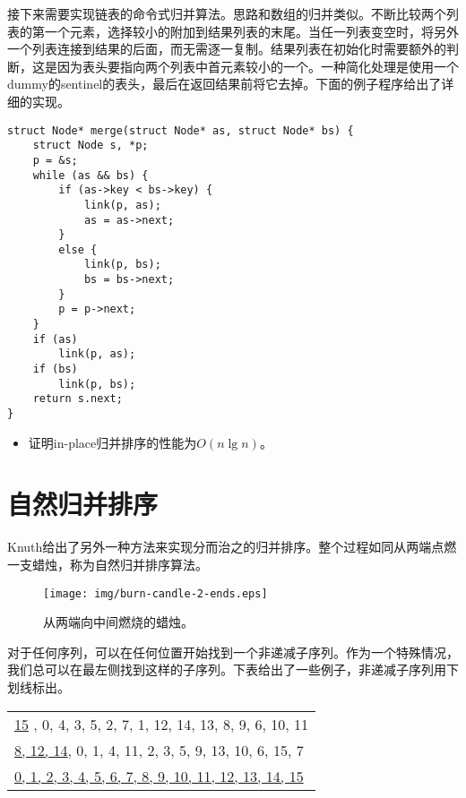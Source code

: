 \documentclass[UTF8]{article}
\begin{document}
接下来需要实现链表的命令式归并算法。思路和数组的归并类似。不断比较两个列表的第一个元素，选择较小的附加到结果列表的末尾。当任一列表变空时，将另外一个列表连接到结果的后面，而无需逐一复制。结果列表在初始化时需要额外的判断，这是因为表头要指向两个列表中首元素较小的一个。一种简化处理是使用一个dummy的sentinel的表头，最后在返回结果前将它去掉。下面的例子程序给出了详细的实现。

\lstset{language=C}
\begin{lstlisting}
struct Node* merge(struct Node* as, struct Node* bs) {
    struct Node s, *p;
    p = &s;
    while (as && bs) {
        if (as->key < bs->key) {
            link(p, as);
            as = as->next;
        }
        else {
            link(p, bs);
            bs = bs->next;
        }
        p = p->next;
    }
    if (as)
        link(p, as);
    if (bs)
        link(p, bs);
    return s.next;
}
\end{lstlisting}

\begin{Exercise}
\begin{itemize}
\item 证明in-place归并排序的性能为$O(n \lg n)$。
\end{itemize}
\end{Exercise}

\section{自然归并排序}

Knuth给出了另外一种方法来实现分而治之的归并排序。整个过程如同从两端点燃一支蜡烛\cite{TAOCP}，称为自然归并排序算法。

\begin{figure}[htbp]
 \centering
 \texttt{[image: img/burn-candle-2-ends.eps]}
 \caption{从两端向中间燃烧的蜡烛。}
 \label{fig:burn-candle}
\end{figure}

对于任何序列，可以在任何位置开始找到一个非递减子序列。作为一个特殊情况，我们总可以在最左侧找到这样的子序列。下表给出了一些例子，非递减子序列用下划线标出。

\begin{tabular}{ | l |}
\hline
\underline{15} , 0, 4, 3, 5, 2, 7, 1, 12, 14, 13, 8, 9, 6, 10, 11 \\
\underline{8, 12, 14}, 0, 1, 4, 11, 2, 3, 5, 9, 13, 10, 6, 15, 7 \\
\underline{0, 1, 2, 3, 4, 5, 6, 7, 8, 9, 10, 11, 12, 13, 14, 15} \\
\hline
\end{tabular}
\end{document}
